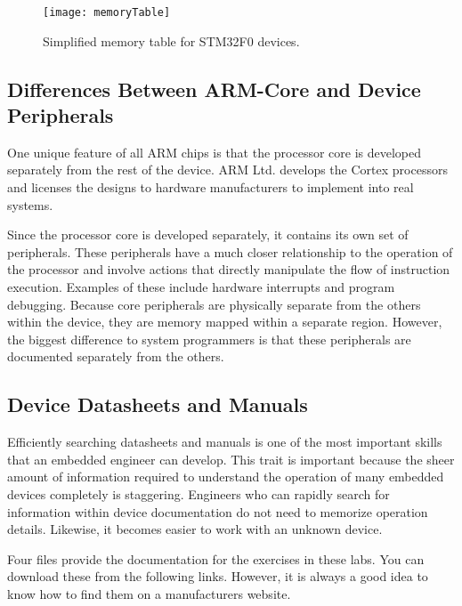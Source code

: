 \documentclass[11pt,fleqn]{book} %
\begin{document}
\begin{figure}[]
    \centering\texttt{[image: memoryTable]}
    \caption{Simplified memory table for STM32F0 devices.}
    \label{memoryTable}
\end{figure}


\subsection{Differences Between ARM-Core and Device Peripherals}

One unique feature of all ARM chips is that the processor core is developed separately from the rest of the device. ARM Ltd. develops the Cortex processors and licenses the designs to hardware manufacturers to implement into real systems. 

Since the processor core is developed separately, it contains its own set of peripherals. These peripherals have a much closer relationship to the operation of the processor and involve actions that directly manipulate the flow of instruction execution. Examples of these include hardware interrupts and program debugging. Because core peripherals are physically separate from the others within the device, they are memory mapped within a separate region. However, the biggest difference to system programmers is that these peripherals are documented separately from the others.


\subsection{Device Datasheets and Manuals}

Efficiently searching datasheets and manuals is one of the most important skills that an embedded engineer can develop. This trait is important because the sheer amount of information required to understand the operation of many embedded devices completely is staggering. 
Engineers who can rapidly search for information within device documentation do not need to memorize operation details. Likewise, it becomes easier to work with an unknown device. 

Four files provide the documentation for the exercises in these labs. You can download these from the following links. However, it is always a good idea to know how to find them on a manufacturers website.
\end{document}
